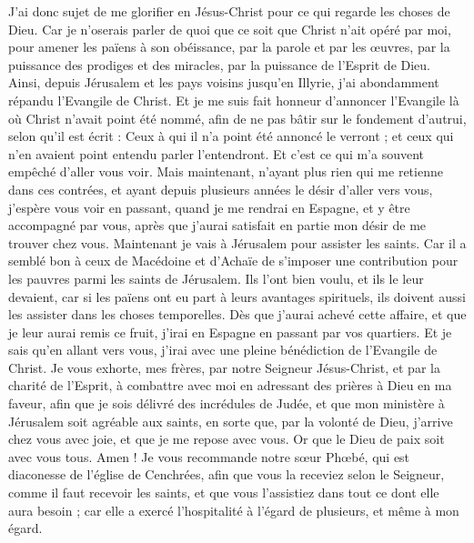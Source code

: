 \begin{multicols}{2}
J'ai donc sujet de me glorifier en Jésus-Christ pour ce qui regarde les choses de Dieu.
Car je n’oserais parler de quoi que ce soit que Christ n’ait opéré par moi, pour amener les païens à son obéissance, par la parole et par les œuvres,
par la puissance des prodiges et des miracles, par la puissance de l'Esprit de Dieu. Ainsi, depuis Jérusalem et les pays voisins jusqu’en Illyrie, j’ai abondamment répandu l’Evangile de Christ.
Et je me suis fait honneur d’annoncer l’Evangile là où Christ n’avait point été nommé, afin de ne pas bâtir sur le fondement d’autrui, selon qu'il est écrit :
Ceux à qui il n'a point été annoncé le verront ; et ceux qui n'en avaient point entendu parler l’entendront.
Et c’est ce qui m'a souvent empêché d’aller vous voir.
Mais maintenant, n’ayant plus rien qui me retienne dans ces contrées, et ayant depuis plusieurs années le désir d’aller vers vous,
j’espère vous voir en passant, quand je me rendrai en Espagne, et y être accompagné par vous, après que j’aurai satisfait en partie mon désir de me trouver chez vous.
Maintenant je vais à Jérusalem pour assister les saints.
Car il a semblé bon à ceux de Macédoine et d’Achaïe de s’imposer une contribution pour les pauvres parmi les saints de Jérusalem.
Ils l’ont bien voulu, et ils le leur devaient, car si les païens ont eu part à leurs avantages spirituels, ils doivent aussi les assister dans les choses temporelles.
Dès que j'aurai achevé cette affaire, et que je leur aurai remis ce fruit, j'irai en Espagne en passant par vos quartiers.
Et je sais qu’en allant vers vous, j’irai avec une pleine bénédiction de l'Evangile de Christ.
Je vous exhorte, mes frères, par notre Seigneur Jésus-Christ, et par la charité de l'Esprit, à combattre avec moi en adressant des prières à Dieu en ma faveur,
afin que je sois délivré des incrédules de Judée, et que mon ministère à Jérusalem soit agréable aux saints,
en sorte que, par la volonté de Dieu, j’arrive chez vous avec joie, et que je me repose avec vous.
Or que le Dieu de paix soit avec vous tous. Amen !
\VerseOne{}Je vous recommande notre sœur Phœbé, qui est diaconesse de l'église de Cenchrées,
afin que vous la receviez selon le Seigneur, comme il faut recevoir les saints, et que vous l'assistiez dans tout ce dont elle aura besoin ; car elle a exercé l'hospitalité à l'égard de plusieurs, et même à mon égard.

\end{multicols}
